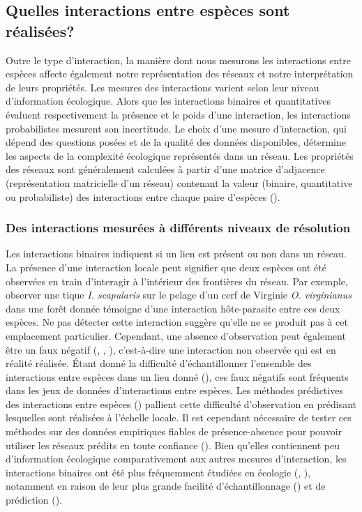 \subsection{Quelles interactions entre espèces sont réalisées?} 

Outre le type d'interaction, la manière dont nous mesurons les interactions
entre espèces affecte également notre représentation des réseaux et notre
interprétation de leurs propriétés. Les mesures des interactions varient selon
leur niveau d'information écologique. Alors que les interactions binaires et
quantitatives évaluent respectivement la présence et le poids d'une interaction,
les interactions probabilistes mesurent son incertitude. Le choix d'une mesure
d'interaction, qui dépend des questions posées et de la qualité des données
disponibles, détermine les aspects de la complexité écologique représentés dans
un réseau. Les propriétés des réseaux sont généralement calculées à partir d'une
matrice d'adjacence (représentation matricielle d'un réseau) contenant la valeur
(binaire, quantitative ou probabiliste) des interactions entre chaque paire
d'espèces (\cite{Delmas2019Analysing}).

\subsubsection{Des interactions mesurées à différents niveaux de résolution} 

Les interactions binaires indiquent si un lien est présent ou non dans un
réseau. La présence d'une interaction locale peut signifier que deux espèces ont
été observées en train d'interagir à l'intérieur des frontières du réseau. Par
exemple, observer une tique \textit{I. scapularis} sur le pelage d'un cerf de
Virginie \textit{O. virginianus} dans une forêt donnée témoigne d'une
interaction hôte-parasite entre ces deux espèces. Ne pas détecter cette
interaction suggère qu'elle ne se produit pas à cet emplacement particulier.
Cependant, une absence d'observation peut également être un faux négatif
(\cite{Bluthgen2010Why}, \cite{Chacoff2012Evaluating}, \cite{Stock2017Linear}),
c'est-à-dire une interaction non observée qui est en réalité réalisée. Étant
donné la difficulté d'échantillonner l'ensemble des interactions entre espèces
dans un lieu donné (\cite{Jordano2016Sampling}), ces faux négatifs sont
fréquents dans les jeux de données d'interactions entre espèces. Les méthodes
prédictives des interactions entre espèces (\cite{Strydom2021Roadmapa}) pallient
cette difficulté d'observation en prédisant lesquelles sont réalisées à
l'échelle locale. Il est cependant nécessaire de tester ces méthodes sur des
données empiriques fiables de présence-absence pour pouvoir utiliser les réseaux
prédits en toute confiance (\cite{Brimacombe2024Applying}). Bien qu'elles
contiennent peu d'information écologique comparativement aux autres mesures
d'interaction, les interactions binaires ont été plus fréquemment étudiées en
écologie (\cite{Pascual2006Ecological}, \cite{Delmas2019Analysing}), notamment
en raison de leur plus grande facilité d'échantillonnage
(\cite{Jordano2016Sampling}) et de prédiction (\cite{Strydom2021Roadmapa}).

